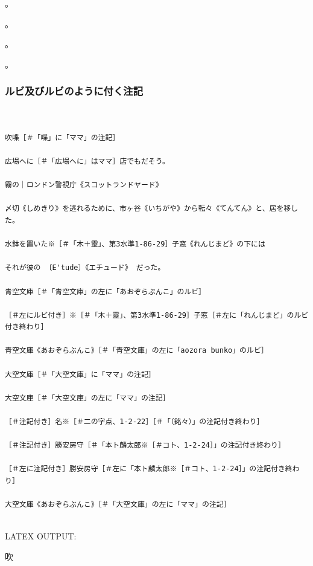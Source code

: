 \documentclass[a4paper,tate]{jlreq}
\begin{document}
。


。


。


。





\newpage
\subsubsection*{ルビ及びルビのように付く注記}
\footnotesize
\linespread{1.0}
\begin{verbatim}


吹喋［＃「喋」に「ママ」の注記］

広場へに［＃「広場へに」はママ］店でもだそう。

霧の｜ロンドン警視庁《スコットランドヤード》

〆切《しめきり》を逃れるために、市ヶ谷《いちがや》から転々《てんてん》と、居を移した。

水鉢を置いた※［＃「木＋靈」、第3水準1-86-29］子窓《れんじまど》の下には

それが彼の 〔E'tude〕《エチュード》 だった。

青空文庫［＃「青空文庫」の左に「あおぞらぶんこ」のルビ］

［＃左にルビ付き］※［＃「木＋靈」、第3水準1-86-29］子窓［＃左に「れんじまど」のルビ付き終わり］

青空文庫《あおぞらぶんこ》［＃「青空文庫」の左に「aozora bunko」のルビ］

大空文庫［＃「大空文庫」に「ママ」の注記］

大空文庫［＃「大空文庫」の左に「ママ」の注記］

［＃注記付き］名※［＃二の字点、1-2-22］［＃「（銘々）」の注記付き終わり］

［＃注記付き］勝安房守［＃「本ト麟太郎※［＃コト、1-2-24］」の注記付き終わり］

［＃左に注記付き］勝安房守［＃左に「本ト麟太郎※［＃コト、1-2-24］」の注記付き終わり］

大空文庫《あおぞらぶんこ》［＃「大空文庫」の左に「ママ」の注記］


\end{verbatim}
\linespread{1.4}
\normalsize
LATEX OUTPUT:
\zw



吹
\end{document}
